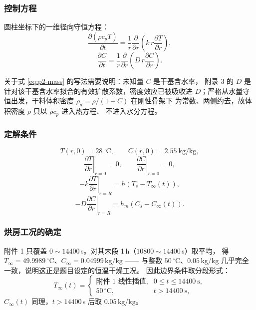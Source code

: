 \documentclass[12pt,a4paper]{ctexart}
\begin{document}
\subsubsection{控制方程}

圆柱坐标下的一维径向守恒方程：
\begin{equation}
  \frac{\partial(\rho c_p T)}{\partial t}
  =\frac{1}{r}\frac{\partial}{\partial r}
   \left(k\,r\frac{\partial T}{\partial r}\right),
  \label{eq:p2-heat}
\end{equation}
\begin{equation}
  \frac{\partial C}{\partial t}
  =\frac{1}{r}\frac{\partial}{\partial r}
   \left(D\,r\frac{\partial C}{\partial r}\right).
  \label{eq:p2-mass}
\end{equation}

关于式 \eqref{eq:p2-mass} 的写法需要说明：未知量 $C$ 是干基含水率，
附录 3 的 $D$ 是针对该干基含水率拟合的有效扩散系数，密度效应已被吸收进
$D$；严格从水量守恒出发，干料体积密度 $\rho_d=\rho/(1+C)$ 在刚性骨架下
为常数、两侧约去，故体积密度 $\rho$ 只以 $\rho c_p$ 进入热方程、
不进入水分方程。

\subsubsection{定解条件}

\begin{equation}
  T(r,0)=28\,^\circ\mathrm{C},\qquad C(r,0)=2.55\ \mathrm{kg/kg},
  \label{eq:p2-ic}
\end{equation}
\begin{equation}
  \left.\frac{\partial T}{\partial r}\right|_{r=0}=0,\qquad
  \left.\frac{\partial C}{\partial r}\right|_{r=0}=0,
  \label{eq:p2-center}
\end{equation}
\begin{equation}
  -k\left.\frac{\partial T}{\partial r}\right|_{r=R}
  =h\left(T_s-T_\infty(t)\right),
  \label{eq:p2-bcT}
\end{equation}
\begin{equation}
  -D\left.\frac{\partial C}{\partial r}\right|_{r=R}
  =h_m\left(C_s-C_\infty(t)\right).
  \label{eq:p2-bcC}
\end{equation}

\subsubsection{烘房工况的确定}
\label{sec:bc}

附件 1 只覆盖 $0\sim14400$\,s。对其末段 1\,h（$10800\sim14400$\,s）取平均，
得 $T_\infty=49.9989\,^\circ$C、$C_\infty=0.04999$\,kg/kg —— 与整数
$50\,^\circ$C、$0.05$\,kg/kg 几乎完全一致，说明这正是题目设定的恒温干燥工况。
因此边界条件取分段形式：
\begin{equation}
  T_\infty(t)=
  \begin{cases}
    \text{附件 1 线性插值}, & 0\le t\le 14400\ \mathrm{s},\\[2pt]
    50\,^\circ\mathrm{C}, & t>14400\ \mathrm{s},
  \end{cases}
  \label{eq:p2-Tinf}
\end{equation}
$C_\infty(t)$ 同理，$t>14400$\,s 后取 $0.05$\,kg/kg。
\end{document}
